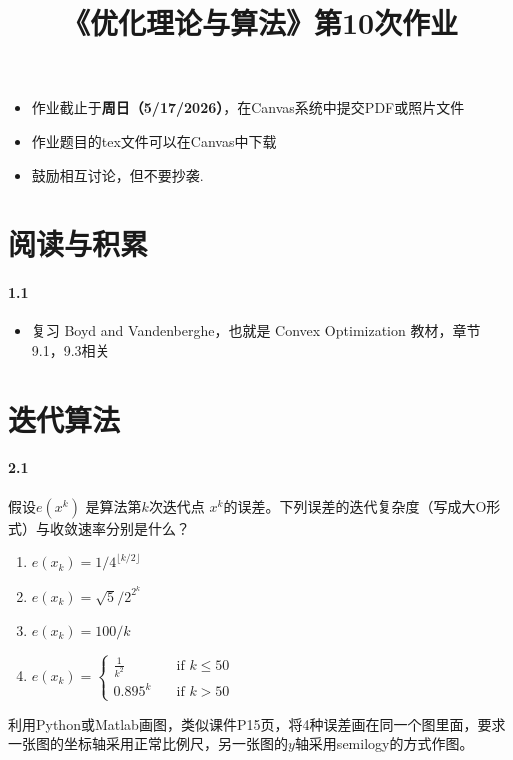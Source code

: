 \documentclass[12pt,a4paper]{article}
\begin{document}
\title{
{《优化理论与算法》第10次作业
}
}
\date{}


\maketitle
\begin{itemize}
	\item 作业截止于{\bf 周日（5/17/2026）}，在Canvas系统中提交PDF或照片文件
	\item 作业题目的tex文件可以在Canvas中下载
	\item 鼓励相互讨论，但不要抄袭.
\end{itemize}

\section{阅读与积累}
\paragraph{1.1}
\begin{itemize}
	\item 复习 Boyd and Vandenberghe，也就是 Convex Optimization 教材，章节9.1，9.3相关
\end{itemize}

\section{迭代算法}

\paragraph{2.1} 假设$e(x^k)$ 是算法第$k$次迭代点 $x^k$的误差。下列误差的迭代复杂度（写成大O形式）与收敛速率分别是什么？
\begin{enumerate}
	\item[(a)] $e(x_k)=1/4^{\lfloor k/2 \rfloor}$
	\item[(b)] $e(x_k)=\sqrt{5}/2^{2^{k}}$
	\item[(c)] $e(x_k)=100/k$
	\item[(d)] $e(x_k)=\begin{cases}
	\frac{1}{k^2} & \quad \text{if } k \leq 50  \\  0.895^k & \quad \text{if } k>50 
	\end{cases}$
\end{enumerate}
利用Python或Matlab画图，类似课件P15页，将4种误差画在同一个图里面，要求一张图的坐标轴采用正常比例尺，另一张图的$y$轴采用semilogy的方式作图。
\end{document}
